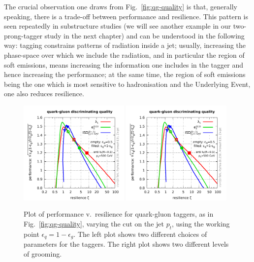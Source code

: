The crucial observation one draws from Fig.~\ref{fig:qg-quality} is
that, generally speaking, there is a trade-off between performance and
resilience.
%
This pattern is seen repeatedly in substructure studies (we will see
another example in our two-prong-tagger study in the next chapter) and can be
understood in the following way: tagging constrains patterns of
radiation inside a jet; usually, increasing the phase-space over which
we include the radiation, and in particular the region of soft
emissions, means increasing the information one includes in the tagger
and hence increasing the performance; at the same time, the region of soft
emissions being the one which is most sensitive to hadronisation and
the Underlying Event, one also reduces resilience.

\begin{figure}[t!]
  \includegraphics[width=0.48\textwidth,page=3]{figures/qg-performance.pdf}%
  \hfill%
  \includegraphics[width=0.48\textwidth,page=2]{figures/qg-performance.pdf}
  \caption{Plot of performance v.\ resilience for quark-gluon taggers,
    as in Fig.~\ref{fig:qg-quality}, varying the cut on the jet $p_t$,
    using the working point $\epsilon_q=1-\epsilon_g$. The left plot
    shows two different choices of parameters for the taggers. The
    right plot shows two different levels of
    grooming. }\label{fig:qg-quality-ptdep}
\end{figure}


